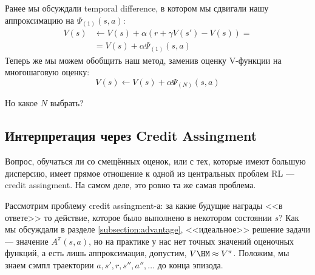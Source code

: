 Ранее мы обсуждали temporal difference, в котором мы сдвигали нашу аппроксимацию на $\Psi_{(1)}(s, a)$:
\begin{align*}
V(s) &\leftarrow V(s) + \alpha \left( r + \gamma V(s') - V(s) \right) = \\ &= V(s) + \alpha \Psi_{(1)}(s, a)
\end{align*}
Теперь же мы можем обобщить наш метод, заменив оценку V-функции на многошаговую оценку:
$$V(s) \leftarrow V(s) + \alpha \Psi_{(N)}(s, a)$$

Но какое $N$ выбрать?

\subsection{Интерпретация через Credit Assingment}

Вопрос, обучаться ли со смещённых оценок, или с тех, которые имеют большую дисперсию, имеет прямое отношение к одной из центральных проблем RL --- credit assingment. На самом деле, это ровно та же самая проблема. 

Рассмотрим проблему credit assingment-а: за какие будущие награды <<в ответе>> то действие, которое было выполнено в некотором состоянии $s$? Как мы обсуждали в разделе \ref{subsection:advantage}, <<идеальное>> решение задачи --- значение $A^\pi(s, a)$, но на практике у нас нет точных значений оценочных функций, а есть лишь аппроксимация, допустим, $V \HM \approx V^\pi$. Положим, мы знаем сэмпл траектории $a, s', r, s'', a'', \dots$ до конца эпизода. 


